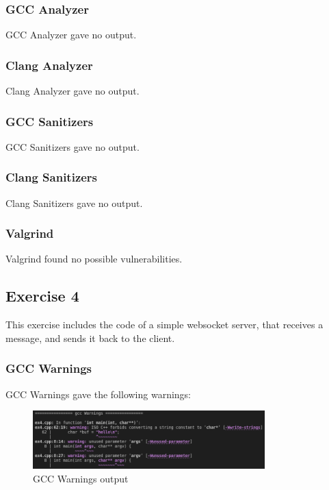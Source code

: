 \documentclass{article}
\begin{document}
\subsubsection{GCC Analyzer}

GCC Analyzer gave no output.

\subsubsection{Clang Analyzer}

Clang Analyzer gave no output.

\subsubsection{GCC Sanitizers}

GCC Sanitizers gave no output.

\subsubsection{Clang Sanitizers}

Clang Sanitizers gave no output.

\subsubsection{Valgrind}

Valgrind found no possible vulnerabilities.

\subsection{Exercise 4}

This exercise includes the code of a simple websocket server, that receives a message, and sends it back to the client.

\subsubsection{GCC Warnings}

GCC Warnings gave the following warnings:

\begin{figure}[ht!]
    \centering
    \includegraphics[width=0.8\textwidth]{images/ex4/gccWarnings.png}
    \caption{GCC Warnings output}\label{fig:ex4/gccWarnings}
\end{figure}
\end{document}
